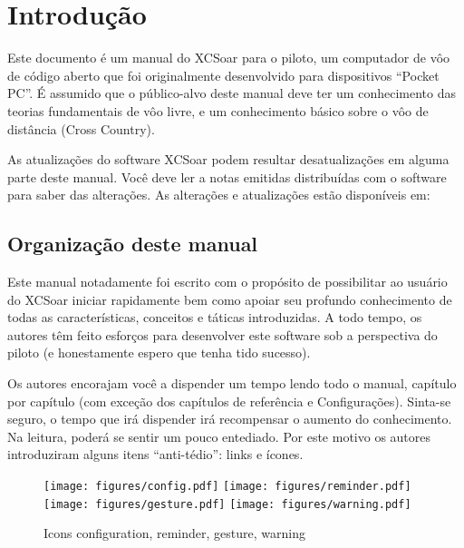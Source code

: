 \chapter{Introdução}\label{cha:introduction}
Este documento é um manual do XCSoar para o piloto, um computador de vôo de código aberto que foi originalmente desenvolvido para dispositivos “Pocket PC”.  É assumido que o público-alvo deste manual deve ter um conhecimento das teorias fundamentais de vôo livre, e um conhecimento básico sobre o vôo de distância (Cross Country).

As atualizações do software XCSoar podem resultar desatualizações em alguma parte deste manual.   Você deve ler a notas emitidas distribuídas com o software para saber das alterações.  As alterações e atualizações estão disponíveis em:  
\begin{quote}
\xcsoarwebsite{}
\end{quote}

\section{Organização deste manual}

Este manual notadamente foi escrito com o propósito de possibilitar ao usuário do XCSoar iniciar rapidamente bem como apoiar seu profundo conhecimento de todas as características, conceitos e táticas introduzidas.  A todo tempo, os autores têm feito esforços para desenvolver este software sob a perspectiva do piloto (e honestamente espero que tenha tido sucesso).

Os autores encorajam você a dispender um tempo lendo todo o manual, capítulo por capítulo (com exceção dos capítulos de referência e Configurações).  Sinta-se seguro, o tempo que irá dispender irá recompensar o aumento do conhecimento.  Na leitura, poderá se sentir um pouco entediado.  Por este motivo os autores introduziram alguns itens “anti-tédio”: links e ícones.

\begin{figure}[h]
\centering
\texttt{[image: figures/config.pdf]}
\hspace{1.5cm}
\texttt{[image: figures/reminder.pdf]}
\hspace{1.5cm}
\texttt{[image: figures/gesture.pdf]}
\hspace{1.5cm}
\texttt{[image: figures/warning.pdf]}
\caption{Icons configuration, reminder, gesture, warning}
\end{figure}

